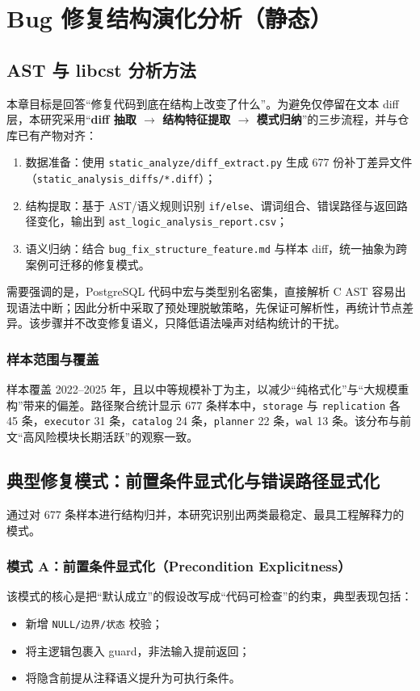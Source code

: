 \chapter{Bug 修复结构演化分析（静态）}\label{chap:static}

\section{AST 与 libcst 分析方法}
本章目标是回答“修复代码到底在结构上改变了什么”。为避免仅停留在文本 diff 层，本研究采用“\textbf{diff 抽取 $\rightarrow$ 结构特征提取 $\rightarrow$ 模式归纳}”的三步流程，并与仓库已有产物对齐：
\begin{enumerate}
    \item 数据准备：使用 \texttt{static\_analyze/diff\_extract.py} 生成 677 份补丁差异文件（\texttt{static\_analysis\_diffs/*.diff}）；
    \item 结构提取：基于 AST/语义规则识别 \texttt{if/else}、谓词组合、错误路径与返回路径变化，输出到 \texttt{ast\_logic\_analysis\_report.csv}；
    \item 语义归纳：结合 \texttt{bug\_fix\_structure\_feature.md} 与样本 diff，统一抽象为跨案例可迁移的修复模式。
\end{enumerate}

需要强调的是，PostgreSQL 代码中宏与类型别名密集，直接解析 C AST 容易出现语法中断；因此分析中采取了预处理脱敏策略，先保证可解析性，再统计节点差异。该步骤并不改变修复语义，只降低语法噪声对结构统计的干扰。

\subsection*{样本范围与覆盖}
样本覆盖 2022--2025 年，且以中等规模补丁为主，以减少“纯格式化”与“大规模重构”带来的偏差。路径聚合统计显示 677 条样本中，\texttt{storage} 与 \texttt{replication} 各 45 条，\texttt{executor} 31 条，\texttt{catalog} 24 条，\texttt{planner} 22 条，\texttt{wal} 13 条。该分布与前文“高风险模块长期活跃”的观察一致。

\section{典型修复模式：前置条件显式化与错误路径显式化}
通过对 677 条样本进行结构归并，本研究识别出两类最稳定、最具工程解释力的模式。

\subsection*{模式 A：前置条件显式化（Precondition Explicitness）}
该模式的核心是把“默认成立”的假设改写成“代码可检查”的约束，典型表现包括：
\begin{itemize}
    \item 新增 \texttt{NULL/边界/状态} 校验；
    \item 将主逻辑包裹入 guard，非法输入提前返回；
    \item 将隐含前提从注释语义提升为可执行条件。
\end{itemize}

